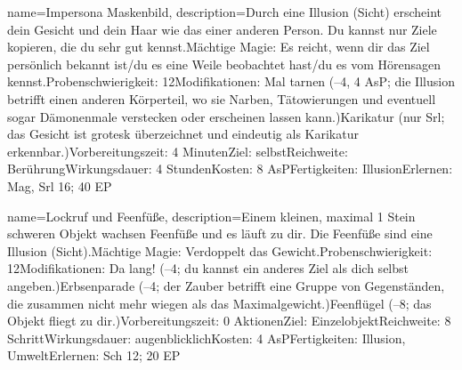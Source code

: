 {
    name={Impersona Maskenbild},
    description={Durch eine Illusion (Sicht) erscheint dein Gesicht und dein Haar wie das einer anderen Person. Du kannst nur Ziele kopieren, die du sehr gut kennst.\newline Mächtige Magie: Es reicht, wenn dir das Ziel persönlich bekannt ist/du es eine Weile beobachtet hast/du es vom Hörensagen kennst.\newline Probenschwierigkeit: 12\newline Modifikationen: Mal tarnen (–4, 4 AsP; die Illusion betrifft einen anderen Körperteil, wo sie Narben, Tätowierungen und eventuell sogar Dämonenmale verstecken oder erscheinen lassen kann.)\newline Karikatur (nur Srl; das Gesicht ist grotesk überzeichnet und eindeutig als Karikatur erkennbar.)\newline Vorbereitungszeit: 4 Minuten\newline Ziel: selbst\newline Reichweite: Berührung\newline Wirkungsdauer: 4 Stunden\newline Kosten: 8 AsP\newline Fertigkeiten: Illusion\newline Erlernen: Mag, Srl 16; 40 EP}
}


{
    name={Lockruf und Feenfüße},
    description={Einem kleinen, maximal 1 Stein schweren Objekt wachsen Feenfüße und es läuft zu dir. Die Feenfüße sind eine Illusion (Sicht).\newline Mächtige Magie: Verdoppelt das Gewicht.\newline Probenschwierigkeit: 12\newline Modifikationen: Da lang! (–4; du kannst ein anderes Ziel als dich selbst angeben.)\newline Erbsenparade (–4; der Zauber betrifft eine Gruppe von Gegenständen, die zusammen nicht mehr wiegen als das Maximalgewicht.)\newline Feenflügel (–8; das Objekt fliegt zu dir.)\newline Vorbereitungszeit: 0 Aktionen\newline Ziel: Einzelobjekt\newline Reichweite: 8 Schritt\newline Wirkungsdauer: augenblicklich\newline Kosten: 4 AsP\newline Fertigkeiten: Illusion, Umwelt\newline Erlernen: Sch 12; 20 EP}
}


